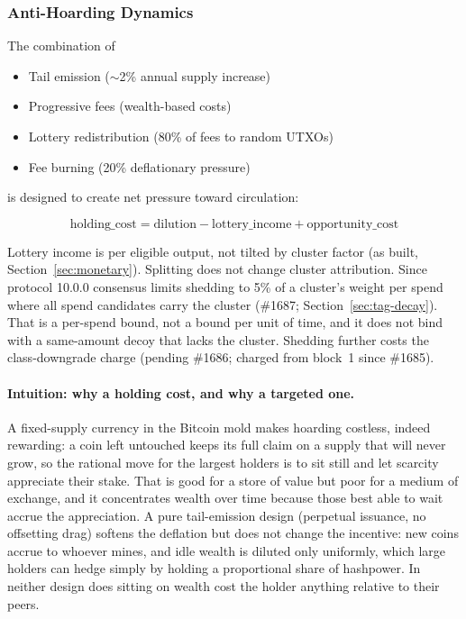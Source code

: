 \subsubsection{Anti-Hoarding Dynamics}

The combination of
\begin{itemize}
  \item Tail emission ($\sim$2\% annual supply increase)
  \item Progressive fees (wealth-based costs)
  \item Lottery redistribution (80\% of fees to random UTXOs)
  \item Fee burning (20\% deflationary pressure)
\end{itemize}

is designed to create net pressure toward circulation:

\begin{equation}
\text{holding\_cost} = \text{dilution} - \text{lottery\_income} + \text{opportunity\_cost}
\end{equation}

Lottery income is per eligible output, not tilted by cluster factor (as
built, Section~\ref{sec:monetary}). Splitting does not change cluster
attribution. Since protocol 10.0.0 consensus limits shedding to 5\% of a
cluster's weight per spend where all spend candidates carry the cluster
(\#1687; Section~\ref{sec:tag-decay}). That is a per-spend bound, not a
bound per unit of time, and it does not bind with a same-amount decoy that
lacks the cluster. Shedding further costs the class-downgrade charge (pending
\#1686; charged from block~1 since \#1685).

\paragraph{Intuition: why a holding cost, and why a targeted one.}
A fixed-supply currency in the Bitcoin mold makes hoarding costless, indeed
rewarding: a coin left untouched keeps its full claim on a supply that will
never grow, so the rational move for the largest holders is to sit still and
let scarcity appreciate their stake. That is good for a store of value but
poor for a medium of exchange, and it concentrates wealth over time because
those best able to wait accrue the appreciation. A pure tail-emission design
(perpetual issuance, no offsetting drag) softens the deflation but does not
change the incentive: new coins accrue to whoever mines, and idle wealth is
diluted only uniformly, which large holders can hedge simply by holding a
proportional share of hashpower. In neither design does sitting on wealth cost
the holder anything relative to their peers.

